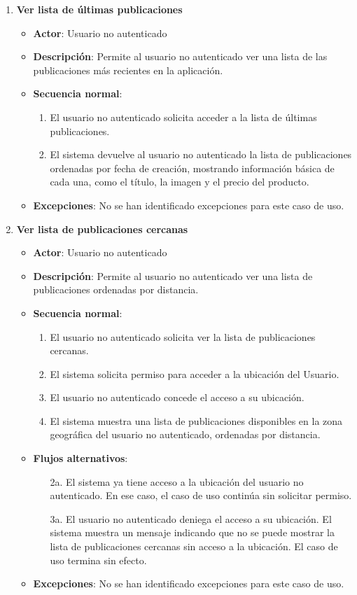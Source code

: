 \begin{enumerate}[label=UC-\protect\twodigits{\arabic*}:, align=left, leftmargin=*]
\item \textbf{Ver lista de últimas publicaciones}
\begin{itemize}
\item \textbf{Actor}: Usuario no autenticado
\item \textbf{Descripción}: Permite al usuario no autenticado ver una lista de las publicaciones más recientes en la aplicación.
\item \textbf{Secuencia normal}:
\begin{enumerate}[label={\arabic*}:]
\item El usuario no autenticado solicita acceder a la lista de últimas publicaciones.
\item El sistema devuelve al usuario no autenticado la lista de publicaciones ordenadas por fecha de creación, mostrando información básica de cada una, como el título, la imagen y el precio del producto.
\end{enumerate}
\item \textbf{Excepciones}: No se han identificado excepciones para este caso de uso.
\end{itemize}

\item \textbf{Ver lista de publicaciones cercanas}
\begin{itemize}
\item \textbf{Actor}: Usuario no autenticado
\item \textbf{Descripción}: Permite al usuario no autenticado ver una lista de publicaciones ordenadas por distancia.
\item \textbf{Secuencia normal}:
\begin{enumerate}[label={\arabic*}:]
\item El usuario no autenticado solicita ver la lista de publicaciones cercanas.
\item El sistema solicita permiso para acceder a la ubicación del Usuario.
\item El usuario no autenticado concede el acceso a su ubicación.
\item El sistema muestra una lista de publicaciones disponibles en la zona geográfica del usuario no autenticado, ordenadas por distancia.
\end{enumerate}
\item \textbf{Flujos alternativos}:
\begin{itemize}
\item[2a.] El sistema ya tiene acceso a la ubicación del usuario no autenticado. En ese caso, el caso de uso continúa sin solicitar permiso.
\item[3a.] El usuario no autenticado deniega el acceso a su ubicación. El sistema muestra un mensaje indicando que no se puede mostrar la lista de publicaciones cercanas sin acceso a la ubicación. El caso de uso termina sin efecto.
\end{itemize}
\item \textbf{Excepciones}: No se han identificado excepciones para este caso de uso.
\end{itemize}


\end{enumerate}
